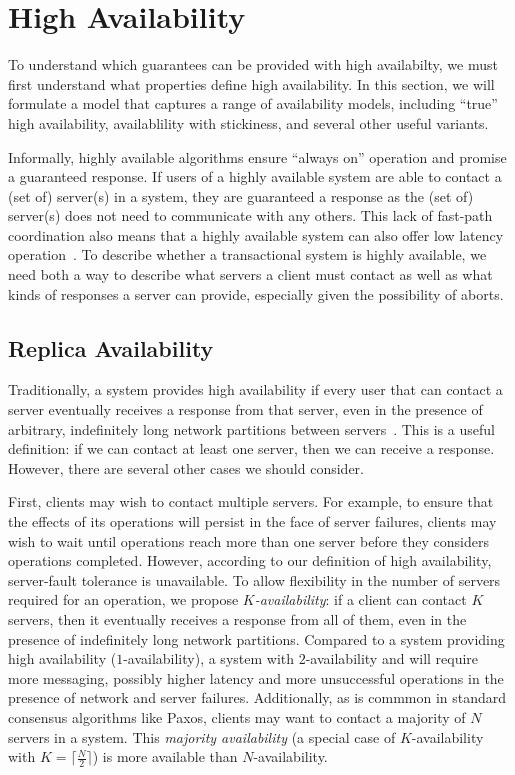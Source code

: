 
\section{High Availability}
\label{sec:availability}

To understand which guarantees can be provided with high availabilty,
we must first understand what properties define high availability. In
this section, we will formulate a model that captures a range of
availability models, including ``true'' high availability,
availablility with stickiness, and several other useful variants.

Informally, highly available algorithms ensure ``always on'' operation
and promise a guaranteed response. If users of a highly available
system are able to contact a (set of) server(s) in a system, they are
guaranteed a response as the (set of) server(s) does not need to
communicate with any others. This lack of fast-path coordination also
means that a highly available system can also offer low latency
operation~\cite{abadi-pacelc}. To describe whether a transactional
system is highly available, we need both a way to describe what
servers a client must contact as well as what kinds of responses a
server can provide, especially given the possibility of aborts.

\subsection{Replica Availability}

Traditionally, a system provides high availability if every user that
can contact a server eventually receives a response from that server,
even in the presence of arbitrary, indefinitely long network
partitions between servers~\cite{gilbert-cap}. This is a useful
definition: if we can contact at least one server, then we can receive
a response. However, there are several other cases we should consider.

First, clients may wish to contact multiple servers. For example, to
ensure that the effects of its operations will persist in the face of
server failures, clients may wish to wait until operations reach more
than one server before they considers operations completed. However,
according to our definition of high availability, server-fault
tolerance is unavailable. To allow flexibility in the number of
servers required for an operation, we propose
\textit{$K$-availability}: if a client can contact $K$ servers, then
it eventually receives a response from all of them, even in the
presence of indefinitely long network partitions. Compared to a system
providing high availability ($1$-availability), a system with
$2$-availability and will require more messaging, possibly higher
latency and more unsuccessful operations in the presence of network
and server failures.  Additionally, as is commmon in standard
consensus algorithms like Paxos, clients may want to contact a
majority of $N$ servers in a system. This \textit{majority
  availability} (a special case of $K$-availability with $K=\lceil
\frac{N}{2} \rceil$) is more available than $N$-availability.

